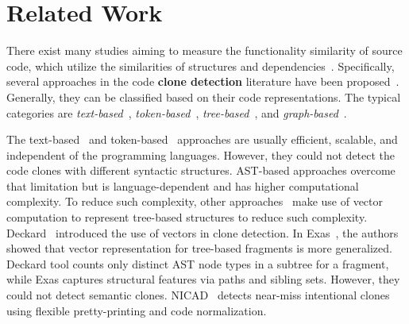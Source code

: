 \section{Related Work}

There exist many studies aiming to measure the functionality
similarity of source code, which utilize the similarities of
structures and
dependencies~\cite{clone-tse07,roy09,baker97,ccfinder,cpminer,deckard,deckard2,horwitz01,baxter98}.
Specifically, several approaches in the code {\bf clone detection}
literature have been
proposed~\cite{clone-tse07,clonebib,roy09}. Generally, they can be
classified based on their code representations. The typical categories
are {\em text-based}~\cite{ducasse-icsm99},
{\em token-based}~\cite{baker97,ccfinder,cpminer,mende08},
{\em tree-based}~\cite{baxter98,deckard}, and
{\em graph-based}~\cite{deckard2,horwitz01,liu06}.

The text-based~\cite{ducasse-icsm99} and token-based~\cite{ccfinder}
approaches are usually efficient, scalable, and independent of the
programming languages. However, they could not detect the code clones
with different syntactic structures. AST-based approaches
overcome~\cite{baxter98} that limitation but is language-dependent and
has higher computational complexity. To reduce such complexity, other
approaches~\cite{fase09,deckard} make use of vector computation to
represent tree-based structures to reduce such complexity.
Deckard~\cite{deckard} introduced the use of vectors in clone
detection. In Exas~\cite{fase09}, the authors showed that vector
representation for tree-based fragments is more generalized. Deckard
tool counts only distinct AST node types in a subtree for a fragment,
while Exas captures structural features via paths and sibling
sets. However, they could not detect semantic clones.
%
NICAD~\cite{nicad08} detects near-miss intentional clones using flexible
pretty-printing and code normalization.

